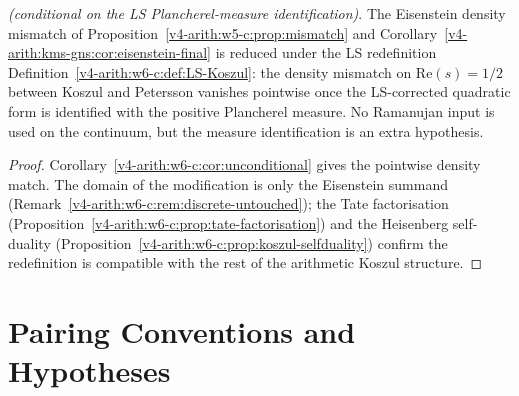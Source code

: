 \begin{corollary}
\label{v4-arith:w6-c:cor:mismatch-closed}
\emph{(conditional on the LS
Plancherel-measure identification)}. The Eisenstein density mismatch of
Proposition~\ref{v4-arith:w5-c:prop:mismatch} and
Corollary~\ref{v4-arith:kms-gns:cor:eisenstein-final} is reduced under the LS redefinition
Definition~\ref{v4-arith:w6-c:def:LS-Koszul}: the density mismatch on
\(\mathrm{Re}(s)=1/2\) between Koszul and Petersson vanishes
pointwise once the LS-corrected quadratic form is identified with the
positive Plancherel measure. No Ramanujan input is used on the
continuum, but the measure identification is an extra hypothesis.
\end{corollary}

\begin{proof}
Corollary~\ref{v4-arith:w6-c:cor:unconditional} gives the pointwise density
match. The domain of the modification is only the Eisenstein
summand
(Remark~\ref{v4-arith:w6-c:rem:discrete-untouched}); the Tate
factorisation (Proposition~\ref{v4-arith:w6-c:prop:tate-factorisation}) and
the Heisenberg self-duality
(Proposition~\ref{v4-arith:w6-c:prop:koszul-selfduality}) confirm the
redefinition is compatible with the rest of the arithmetic Koszul
structure.
\end{proof}

\section{Pairing Conventions and Hypotheses}
\label{v4-arith:w6-c:LS:disjointness-comparison}

